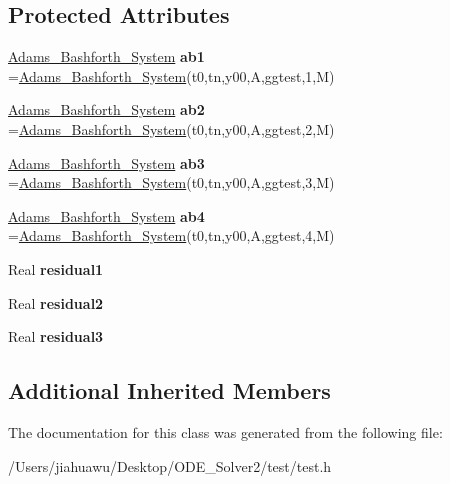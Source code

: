 \subsection*{Protected Attributes}
\begin{DoxyCompactItemize}
\item 
\mbox{\label{class_a_btest_a4271b70b720267e17d05482d70a4bb38}} 
\mbox{\hyperlink{class_adams___bashforth___system}{Adams\+\_\+\+Bashforth\+\_\+\+System}} {\bfseries ab1} =\mbox{\hyperlink{class_adams___bashforth___system}{Adams\+\_\+\+Bashforth\+\_\+\+System}}(t0,tn,y00,A,ggtest,1,M)
\item 
\mbox{\label{class_a_btest_a4cbe471075b88a3124289c94a9b014ff}} 
\mbox{\hyperlink{class_adams___bashforth___system}{Adams\+\_\+\+Bashforth\+\_\+\+System}} {\bfseries ab2} =\mbox{\hyperlink{class_adams___bashforth___system}{Adams\+\_\+\+Bashforth\+\_\+\+System}}(t0,tn,y00,A,ggtest,2,M)
\item 
\mbox{\label{class_a_btest_a50191ecb607907c50f17af824e04e0bb}} 
\mbox{\hyperlink{class_adams___bashforth___system}{Adams\+\_\+\+Bashforth\+\_\+\+System}} {\bfseries ab3} =\mbox{\hyperlink{class_adams___bashforth___system}{Adams\+\_\+\+Bashforth\+\_\+\+System}}(t0,tn,y00,A,ggtest,3,M)
\item 
\mbox{\label{class_a_btest_a939c7359bfe2b0c39591eea9b4a160a4}} 
\mbox{\hyperlink{class_adams___bashforth___system}{Adams\+\_\+\+Bashforth\+\_\+\+System}} {\bfseries ab4} =\mbox{\hyperlink{class_adams___bashforth___system}{Adams\+\_\+\+Bashforth\+\_\+\+System}}(t0,tn,y00,A,ggtest,4,M)
\item 
\mbox{\label{class_a_btest_a736a9e759acffaec7efd6a385e493054}} 
Real {\bfseries residual1}
\item 
\mbox{\label{class_a_btest_acf61ae3467e07312ee2922853659c44b}} 
Real {\bfseries residual2}
\item 
\mbox{\label{class_a_btest_a6f6fa4b1307401a2fe4a4dfbe829c9c8}} 
Real {\bfseries residual3}
\end{DoxyCompactItemize}
\subsection*{Additional Inherited Members}


The documentation for this class was generated from the following file\+:\begin{DoxyCompactItemize}
\item 
/\+Users/jiahuawu/\+Desktop/\+O\+D\+E\+\_\+\+Solver2/test/test.\+h\end{DoxyCompactItemize}
